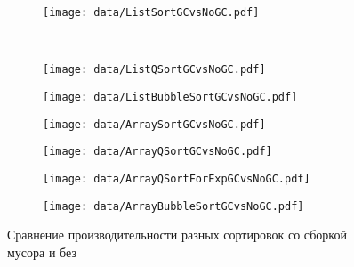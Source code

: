 \begin{figure}[H]
	\centering
	\begin{subfigure}[b]{0.40\textwidth}
       \centering
	   \texttt{[image: data/ListSortGCvsNoGC.pdf]}
	   \label{fig:list.sortGCvsNoGC}
	\end{subfigure}~
	\begin{subfigure}[b]{0.40\textwidth}
       \centering
	   \texttt{[image: data/ListQSortGCvsNoGC.pdf]}
	   \label{fig:list.qsortGCvsNoGC}
	\end{subfigure}
	\begin{subfigure}[b]{0.40\textwidth}
       \centering
	   \texttt{[image: data/ListBubbleSortGCvsNoGC.pdf]}
	   \label{fig:list.bsortGCvsNoGC}
	\end{subfigure}
	\begin{subfigure}[b]{0.40\textwidth}
       \centering
	   \texttt{[image: data/ArraySortGCvsNoGC.pdf]}
	   \label{fig:Array.sortGCvsNoGC}
	\end{subfigure}
	\begin{subfigure}[b]{0.40\textwidth}
       \centering
	   \texttt{[image: data/ArrayQSortGCvsNoGC.pdf]}
	   \label{fig:Array.qsortGCvsNoGC}
	\end{subfigure}
	\begin{subfigure}[b]{0.40\textwidth}
       \centering
	   \texttt{[image: data/ArrayQSortForExpGCvsNoGC.pdf]}
	   \label{fig:Array.qsortexpGCvsNoGC}
	\end{subfigure}
	\begin{subfigure}[b]{0.40\textwidth}
       \centering
	   \texttt{[image: data/ArrayBubbleSortGCvsNoGC.pdf]}
	   \label{fig:Array.bsortGCvsNoGC}
	\end{subfigure}
	\caption{Сравнение производительности разных сортировок со сборкой мусора и без}
	\label{fig:GCvsNoGC}
\end{figure}

